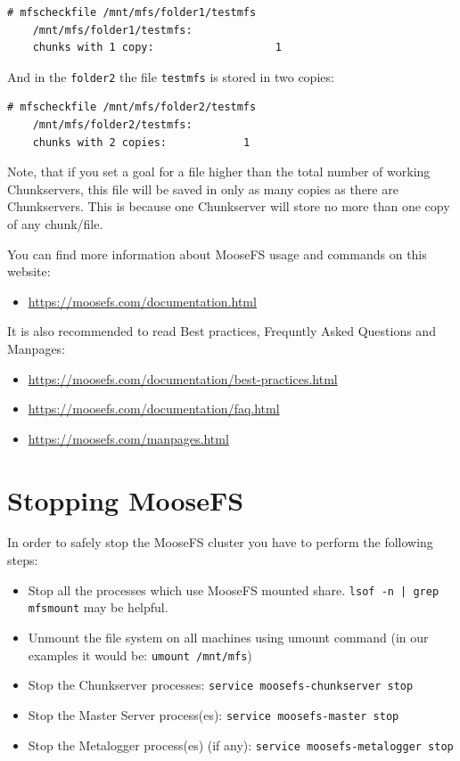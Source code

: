 \documentclass[a4paper,11pt,english]{report}
\def\code#1{\texttt{#1}}
\begin{document}
		\begin{lstlisting}[caption={Checking amount of copies}]
	# mfscheckfile /mnt/mfs/folder1/testmfs
	/mnt/mfs/folder1/testmfs:
	chunks with 1 copy:                   1
		\end{lstlisting}
		
		And in the \code{folder2} the file \code{testmfs} is stored in two copies:
		
		\begin{lstlisting}[caption={Checking amount of copies}]
	# mfscheckfile /mnt/mfs/folder2/testmfs
	/mnt/mfs/folder2/testmfs:
	chunks with 2 copies:            1
		\end{lstlisting}
		
		Note, that if you set a goal for a file higher than the total number of working Chunkservers, this file will be saved in only as many copies as there are Chunkservers. This is because one Chunkserver will store no more than one copy of any chunk/file.
		
		You can find more information about MooseFS usage and commands on this website:
		\begin{itemize}
			\item \url{https://moosefs.com/documentation.html}
		\end{itemize}
		
		It is also recommended to read Best practices, Frequntly Asked Questions and Manpages:
		\begin{itemize}
			\item \url{https://moosefs.com/documentation/best-practices.html}
			\item \url{https://moosefs.com/documentation/faq.html}
			\item \url{https://moosefs.com/manpages.html}
		\end{itemize}
		
		
		
	\chapter{Stopping MooseFS}
		In order to safely stop the MooseFS cluster you have to perform the following steps:
		\begin{itemize}
			\item Stop all the processes which use MooseFS mounted share. \code{lsof -n | grep mfsmount} may be helpful.
			\item Unmount the file system on all machines using umount command (in our examples it would be: \code{umount /mnt/mfs})
			\item Stop the Chunkserver processes: \code{service moosefs-chunkserver stop}
			\item Stop the Master Server process(es): \code{service moosefs-master stop}
			\item Stop the Metalogger process(es) (if any): \code{service moosefs-metalogger stop}
		\end{itemize}
		
\end{document}
